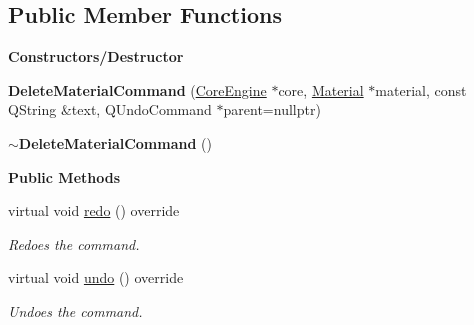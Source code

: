 \subsection*{Public Member Functions}
\begin{Indent}\textbf{ Constructors/\+Destructor}\par
\begin{DoxyCompactItemize}
\item 
\mbox{\label{classrev_1_1_delete_material_command_a8da7e04fdedbaa7321b63fa0def6b827}} 
{\bfseries Delete\+Material\+Command} (\mbox{\hyperlink{classrev_1_1_core_engine}{Core\+Engine}} $\ast$core, \mbox{\hyperlink{classrev_1_1_material}{Material}} $\ast$material, const Q\+String \&text, Q\+Undo\+Command $\ast$parent=nullptr)
\item 
\mbox{\label{classrev_1_1_delete_material_command_a7e47e95a0de499830cd7ab4ee89e09c2}} 
{\bfseries $\sim$\+Delete\+Material\+Command} ()
\end{DoxyCompactItemize}
\end{Indent}
\begin{Indent}\textbf{ Public Methods}\par
\begin{DoxyCompactItemize}
\item 
\mbox{\label{classrev_1_1_delete_material_command_a4ce5dfdfc9fab1a53b24dd13bf14c361}} 
virtual void \mbox{\hyperlink{classrev_1_1_delete_material_command_a4ce5dfdfc9fab1a53b24dd13bf14c361}{redo}} () override
\begin{DoxyCompactList}\small\item\em Redoes the command. \end{DoxyCompactList}\item 
\mbox{\label{classrev_1_1_delete_material_command_a0638be7e668d6cad308b49e6651a272b}} 
virtual void \mbox{\hyperlink{classrev_1_1_delete_material_command_a0638be7e668d6cad308b49e6651a272b}{undo}} () override
\begin{DoxyCompactList}\small\item\em Undoes the command. \end{DoxyCompactList}\end{DoxyCompactItemize}
\end{Indent}
